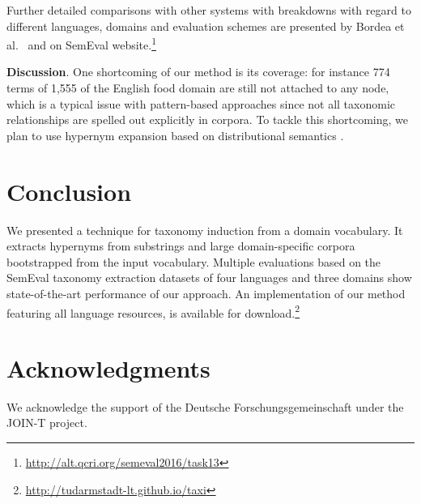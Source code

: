 \documentclass[11pt,letterpaper]{article}
\begin{document}
Further detailed comparisons with other systems with breakdowns with regard to different languages, domains and evaluation schemes are presented by Bordea et al.~ and on SemEval website.\footnote{\url{http://alt.qcri.org/semeval2016/task13}} 

\textbf{Discussion}. One shortcoming of our method is its coverage: for instance 774 terms of 1,555 of the English food domain are still not attached to any node, which is a typical issue with pattern-based approaches since not all taxonomic relationships are spelled out explicitly in corpora. To tackle this shortcoming, we plan to use hypernym expansion  based on distributional semantics \cite{biemann2013text}.

\section{Conclusion}

We presented a technique for taxonomy induction from a domain vocabulary. It extracts hypernyms from substrings and large domain-specific corpora bootstrapped from the input vocabulary. Multiple evaluations based on the SemEval taxonomy extraction datasets of four languages and three domains show state-of-the-art performance of our approach. An implementation of our method featuring all language resources, is available for download.\footnote{ \url{http://tudarmstadt-lt.github.io/taxi}}


\section*{Acknowledgments}

We acknowledge the support of the Deutsche For\-schungs\-gemeinschaft under the JOIN-T project.  





\end{document}
